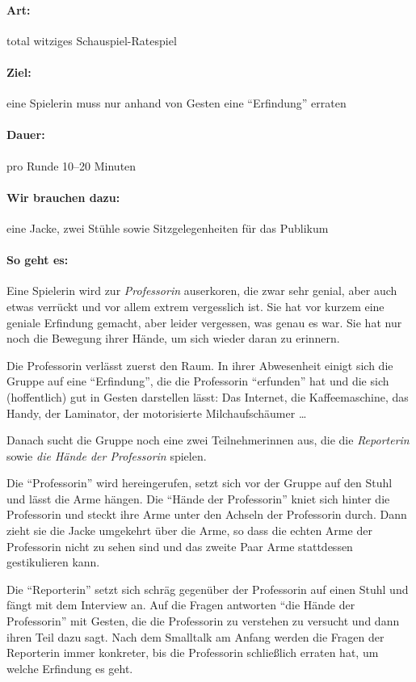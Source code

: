 \paragraph{Art:} total witziges Schauspiel-Ratespiel
\paragraph{Ziel:} eine Spielerin muss nur anhand von Gesten eine "`Erfindung"' erraten 
\paragraph{Dauer:} pro Runde 10--20 Minuten
\paragraph{Wir brauchen dazu:} eine Jacke, zwei Stühle sowie Sitzgelegenheiten für das Publikum
\paragraph{So geht es:} Eine Spielerin wird zur \emph{Professorin} auserkoren, die zwar sehr genial, aber auch etwas verrückt und vor allem extrem vergesslich ist. Sie hat vor kurzem eine geniale Erfindung gemacht, aber leider vergessen, was genau es war. Sie hat nur noch die Bewegung ihrer Hände, um sich wieder daran zu erinnern. 

Die Professorin verlässt zuerst den Raum. In ihrer Abwesenheit einigt sich die Gruppe auf eine "`Erfindung"', die die Professorin "`erfunden"' hat und die sich (hoffentlich) gut in Gesten darstellen lässt: Das Internet, die Kaffeemaschine, das Handy, der Laminator, der motorisierte Milchaufschäumer \ldots

Danach sucht die Gruppe noch eine zwei Teilnehmerinnen aus, die die \emph{Reporterin} sowie \emph{die Hände der Professorin} spielen.

Die "`Professorin"' wird hereingerufen, setzt sich vor der Gruppe auf den Stuhl und lässt die Arme hängen. Die "`Hände der Professorin"' kniet sich hinter die Professorin und steckt ihre Arme unter den Achseln der Professorin durch. Dann zieht sie die Jacke umgekehrt über die Arme, so dass die echten Arme der Professorin nicht zu sehen sind und das zweite Paar Arme stattdessen gestikulieren kann.

Die "`Reporterin"' setzt sich schräg gegenüber der Professorin auf einen Stuhl und fängt mit dem Interview an. Auf die Fragen antworten "`die Hände der Professorin"' mit Gesten, die die Professorin zu verstehen zu versucht und dann ihren Teil dazu sagt. Nach dem Smalltalk am Anfang werden die Fragen der Reporterin immer konkreter, bis die Professorin schließlich erraten hat, um welche Erfindung es geht. 

